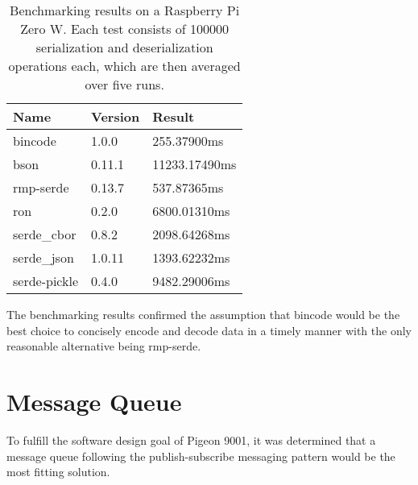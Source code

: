 \begin{table}[H]
\centering
\begin{tabular}{lll}
Name         & Version & Result        \\ \hline
bincode      & 1.0.0   & 255.37900ms   \\
bson         & 0.11.1  & 11233.17490ms \\
rmp-serde    & 0.13.7  & 537.87365ms   \\
ron          & 0.2.0   & 6800.01310ms  \\
serde\_cbor  & 0.8.2   & 2098.64268ms  \\
serde\_json  & 1.0.11  & 1393.62232ms  \\
serde-pickle & 0.4.0   & 9482.29006ms 
\end{tabular}
\caption{Benchmarking results on a Raspberry Pi Zero W. Each test consists of 100000 serialization and deserialization operations each, which are then averaged over five runs.}
\end{table}

The benchmarking results confirmed the assumption that bincode would be the best choice to concisely encode and decode data in a timely manner with the only reasonable alternative being rmp-serde. 

\section{Message Queue}
\author{Philip Trauner}

To fulfill the software design goal of Pigeon 9001, it was determined that a message queue following the publish-subscribe messaging pattern would be the most fitting solution.

